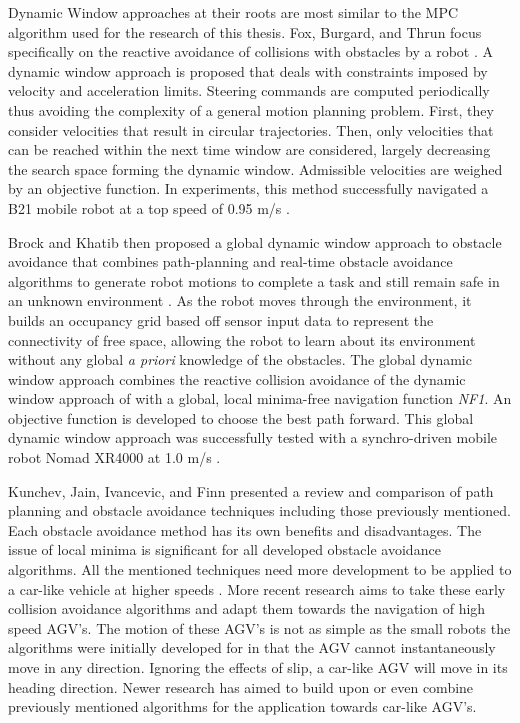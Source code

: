 \documentclass[12pt,onecolumn]{report}
\begin{document}
Dynamic Window approaches at their roots are most similar to the MPC algorithm used for the research of this thesis. Fox, Burgard, and Thrun focus specifically on the reactive avoidance of collisions with obstacles by a robot \cite{Fox1997}. A dynamic window approach is proposed that deals with constraints imposed by velocity and acceleration limits. Steering commands are computed periodically thus avoiding the complexity of a general motion planning problem. First, they consider velocities that result in circular trajectories. Then, only velocities that can be reached within the next time window are considered, largely decreasing the search space forming the dynamic window. Admissible velocities are weighed by an objective function. In experiments, this method successfully navigated a B21 mobile robot at a top speed of 0.95 m/s \cite{Fox1997}.

Brock and Khatib then proposed a global dynamic window approach to obstacle avoidance that combines path-planning and real-time obstacle avoidance algorithms to generate robot motions to complete a task and still remain safe in an unknown environment \cite{Brock&Khatib1999}. As the robot moves through the environment, it builds an occupancy grid based off sensor input data to represent the connectivity of free space, allowing the robot to learn about its environment without any global \textit{a priori} knowledge of the obstacles. The global dynamic window approach combines the reactive collision avoidance of the dynamic window approach of \cite{Fox1997} with a global, local minima-free navigation function \textit{NF1}. An objective function is developed to choose the best path forward. This global dynamic window approach was successfully tested with a synchro-driven mobile robot Nomad XR4000 at 1.0 m/s \cite{Brock&Khatib1999}.

Kunchev, Jain, Ivancevic, and Finn presented a review and comparison of path planning and obstacle avoidance techniques including those previously mentioned. Each obstacle avoidance method has its own benefits and disadvantages. The issue of local minima is significant for all developed obstacle avoidance algorithms. All the mentioned techniques need more development to be applied to a car-like vehicle at higher speeds \cite{Kunchev1999}. More recent research aims to take these early collision avoidance algorithms and adapt them towards the navigation of high speed AGV's. The motion of these AGV's is not as simple as the small robots the algorithms were initially developed for in that the AGV cannot instantaneously move in any direction. Ignoring the effects of slip, a car-like AGV will move in its heading direction. Newer research has aimed to build upon or even combine previously mentioned algorithms for the application towards car-like AGV's.
\end{document}
